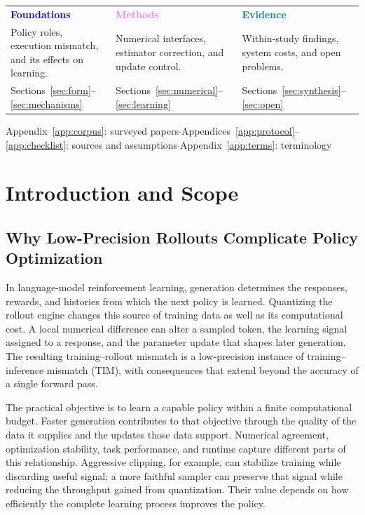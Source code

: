\clearpage
\setcounter{tocdepth}{2}
\tableofcontents

\par\vspace{1.5em}
\par\smallskip
\begingroup\small\setlength{\tabcolsep}{7pt}\renewcommand{\arraystretch}{1.15}
\noindent\begin{tabularx}{\linewidth}{@{}YYY@{}}\toprule
\textcolor{blue}{\textbf{Foundations}} & \textcolor{violet}{\textbf{Methods}} & \textcolor{teal}{\textbf{Evidence}}\\[3pt]
Policy roles, execution mismatch, and its effects on learning. & Numerical interfaces, estimator correction, and update control. & Within-study findings, system costs, and open problems.\\[5pt]
Sections~\ref{sec:form}--\ref{sec:mechanisms} & Sections~\ref{sec:numerical}--\ref{sec:learning} & Sections~\ref{sec:synthesis}--\ref{sec:open}\\\bottomrule
\end{tabularx}
\par\smallskip\noindent Appendix~\ref{app:corpus}: surveyed papers\enspace$\cdot$\enspace Appendices~\ref{app:protocol}--\ref{app:checklist}: sources and assumptions\enspace$\cdot$\enspace Appendix~\ref{app:terms}: terminology
\endgroup
\clearpage


\section{Introduction and Scope}\label{sec:intro}
\subsection{Why Low-Precision Rollouts Complicate Policy Optimization}
In language-model reinforcement learning, generation determines the responses, rewards, and histories from which the next policy is learned. Quantizing the rollout engine changes this source of training data as well as its computational cost. A local numerical difference can alter a sampled token, the learning signal assigned to a response, and the parameter update that shapes later generation. The resulting training--rollout mismatch is a low-precision instance of training--inference mismatch (TIM), with consequences that extend beyond the accuracy of a single forward pass.

The practical objective is to learn a capable policy within a finite computational budget. Faster generation contributes to that objective through the quality of the data it supplies and the updates those data support. Numerical agreement, optimization stability, task performance, and runtime capture different parts of this relationship. Aggressive clipping, for example, can stabilize training while discarding useful signal; a more faithful sampler can preserve that signal while reducing the throughput gained from quantization. Their value depends on how efficiently the complete learning process improves the policy.

